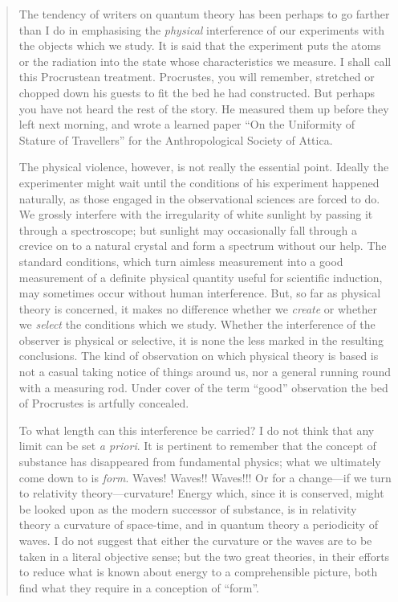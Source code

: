 \begin{quote}
    The tendency of writers on quantum theory has been perhaps to go farther than I do in emphasising the \emph{physical} interference of our experiments with the objects which we study.  It is said that the experiment puts the atoms or the radiation into the state whose characteristics we measure.  I shall call this Procrustean treatment.  Procrustes, you will remember, stretched or chopped down his guests to fit the bed he had constructed.  But perhaps you have not heard the rest of the story.  He measured them up before they left next morning, and wrote a learned paper ``On the Uniformity of Stature of Travellers'' for the Anthropological Society of Attica.

    The physical violence, however, is not really the essential point.  Ideally the experimenter might wait until the conditions of his experiment happened naturally, as those engaged in the observational sciences are forced to do.  We grossly interfere with the irregularity of white sunlight by passing it through a spectroscope; but sunlight may occasionally fall through a crevice on to a natural crystal and form a spectrum without our help.  The standard conditions, which turn aimless measurement into a good measurement of a definite physical quantity useful for scientific induction, may sometimes occur without human interference.  But, so far as physical theory is concerned, it makes no difference whether we \emph{create} or whether we \emph{select} the conditions which we study.  Whether the interference of the observer is physical or selective, it is none the less marked in the resulting conclusions.  The kind of observation on which physical theory is based is not a casual taking notice of things around us, nor a general running round with a measuring rod.  Under cover of the term ``good'' observation the bed of Procrustes is artfully concealed.

    To what length can this interference be carried?  I do not think that any limit can be set \emph{a priori}.  It is pertinent to remember that the concept of substance has disappeared from fundamental physics; what we ultimately come down to is \emph{form}.  Waves!  Waves!!  Waves!!!  Or for a change---if we turn to relativity theory---curvature!  Energy which, since it is conserved, might be looked upon as the modern successor of substance, is in relativity theory a curvature of space-time, and in quantum theory a periodicity of waves.  I do not suggest that either the curvature or the waves are to be taken in a literal objective sense; but the two great theories, in their efforts to reduce what is known about energy to a comprehensible picture, both find what they require in a conception of ``form''.  


\end{quote}

